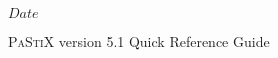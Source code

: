\documentclass{article}
\newcommand\pastix{\textsc{PaStiX}}
\begin{document}

\SVN $Date$


\begin{center}
  {\LARGE \pastix{} version 5.1 Quick Reference Guide}
  \\[1ex] {\tiny \SVNDate}%
\end{center}

\end{document}
